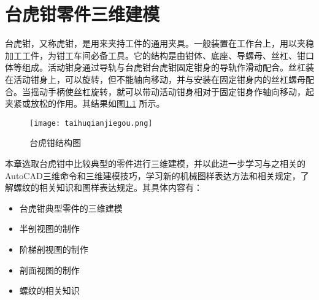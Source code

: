 \chapter{台虎钳零件三维建模}
台虎钳，又称虎钳，是用来夹持工件的通用夹具。一般装置在工作台上，用以夹稳加工工件，为钳工车间必备工具。它的结构是由钳体、底座、导螺母、丝杠、钳口体等组成。活动钳身通过导轨与台虎钳台虎钳固定钳身的导轨作滑动配合。丝杠装在活动钳身上，可以旋转，但不能轴向移动，并与安装在固定钳身内的丝杠螺母配合。当摇动手柄使丝杠旋转，就可以带动活动钳身相对于固定钳身作轴向移动，起夹紧或放松的作用。其结果如图\ref{fig:taihuqianjiegou} 所示。

\begin{figure}[htbp]
\centering
\texttt{[image: taihuqianjiegou.png]}
\caption{台虎钳结构图}\label{fig:taihuqianjiegou}
\end{figure}

本章选取台虎钳中比较典型的零件进行三维建模，并以此进一步学习与之相关的AutoCAD三维命令和三维建模技巧，学习新的机械图样表达方法和相关规定，了解螺纹的相关知识和图样表达规定。其具体内容有：
\begin{itemize}
\item 台虎钳典型零件的三维建模
\item 半剖视图的制作
\item 阶梯剖视图的制作
\item 剖面视图的制作
\item 螺纹的相关知识
\end{itemize}

%
%
%
%
%
%

\endinput